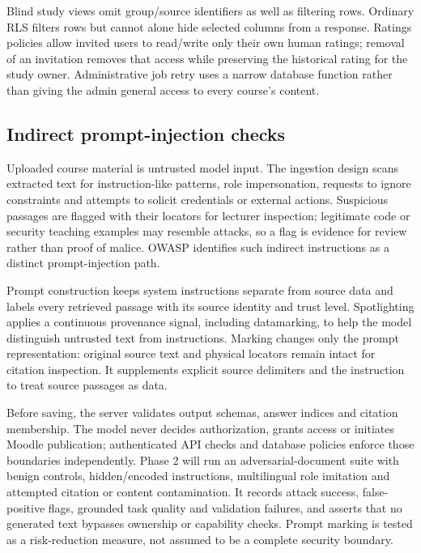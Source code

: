 Blind study views omit group/source identifiers as well as filtering rows. Ordinary RLS filters rows but cannot alone hide selected columns from a response. Ratings policies allow invited users to read/write only their own human ratings; removal of an invitation removes that access while preserving the historical rating for the study owner. Administrative job retry uses a narrow database function rather than giving the admin general access to every course's content.
\subsection{Indirect prompt-injection checks}\label{sec:prompt-injection}
Uploaded course material is untrusted model input. The ingestion design scans extracted text for instruction-like patterns, role impersonation, requests to ignore constraints and attempts to solicit credentials or external actions. Suspicious passages are flagged with their locators for lecturer inspection; legitimate code or security teaching examples may resemble attacks, so a flag is evidence for review rather than proof of malice. OWASP identifies such indirect instructions as a distinct prompt-injection path\citep{owaspprompt}.

Prompt construction keeps system instructions separate from source data and labels every retrieved passage with its source identity and trust level. Spotlighting applies a continuous provenance signal, including datamarking, to help the model distinguish untrusted text from instructions\citep{spotlighting}. Marking changes only the prompt representation: original source text and physical locators remain intact for citation inspection. It supplements explicit source delimiters and the instruction to treat source passages as data.

Before saving, the server validates output schemas, answer indices and citation membership. The model never decides authorization, grants access or initiates Moodle publication; authenticated API checks and database policies enforce those boundaries independently. Phase 2 will run an adversarial-document suite with benign controls, hidden/encoded instructions, multilingual role imitation and attempted citation or content contamination. It records attack success, false-positive flags, grounded task quality and validation failures, and asserts that no generated text bypasses ownership or capability checks. Prompt marking is tested as a risk-reduction measure, not assumed to be a complete security boundary.
